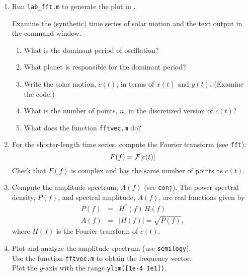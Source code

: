 \documentclass[11pt,titlepage,fleqn]{article}
\begin{document}
\begin{enumerate}

\item Run \verb+lab_fft.m+ to generate the plot in .

Examine the (synthetic) time series of solar motion and the text output in the command window.
%
\begin{enumerate}
\item What is the dominant period of oscillation?
\item What planet is responsible for the dominant period?
\item Write the solar motion, $c(t)$, in terms of $x(t)$ and $y(t)$. (Examine the code.)
\item What is the number of points, $n$, in the discretized version of $c(t)$? 
\item What does the function \verb+fftvec.m+ do?
\end{enumerate}


\item For the shorter-length time series, compute the Fourier transform (see \verb+fft+):
%
\begin{equation*}
F(f) = \mbox{$\cal F$}[c(t)]
\end{equation*}
%
Check that $F(f)$ is complex and has the same number of points as $c(t)$.


\item  Compute the amplitude spectrum, $A(f)$ (see \verb+conj+).
The power spectral density, $P(f)$, and spectral amplitude, $A(f)$, are real functions given by
%
\begin{eqnarray*}
P(f) &=& H^{*}(f)\,H(f)
\\
A(f) &=& |H(f)| = \sqrt{P(f)},
\end{eqnarray*}
%
where $H(f)$ is the Fourier transform of $c(t)$.


\item Plot and analyze the amplitude spectrum (use \verb+semilogy+). \\
Use the function \verb+fftvec.m+ to obtain the frequency vector. \\
Plot the $y$-axis with the range \verb+ylim([1e-4 1e1])+.



\end{enumerate}
\end{document}
